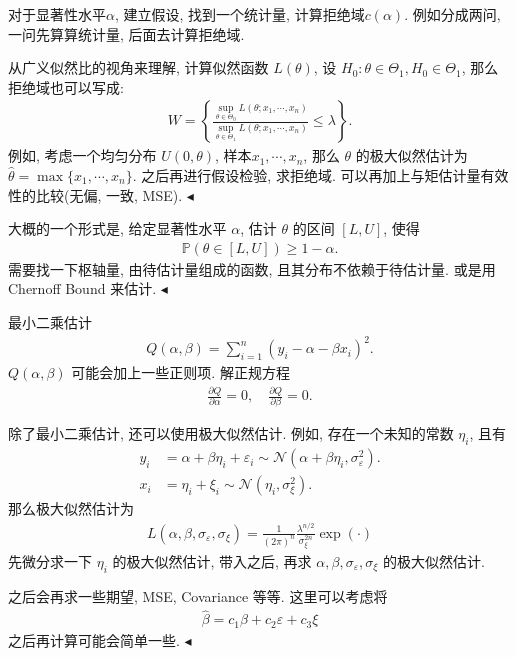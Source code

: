 \documentclass[11pt]{article}
\newenvironment{problem}[2][Problem]{\begin{trivlist}
    \item[\hskip \labelsep {\bfseries #1}\hskip \labelsep {\bfseries #2.}]\songti}{\hfill$\blacktriangleleft$\end{trivlist}}
\newcommand\1{\mathds{1}}
\newcommand\NN{\mathcal{N}}
\newcommand\PP{\mathbb{P}}
\begin{document}
\begin{problem}{5. 假设检验}
    对于显著性水平$\alpha$, 建立假设, 找到一个统计量, 计算拒绝域$c(\alpha)$. 例如分成两问, 一问先算算统计量, 后面去计算拒绝域. 

    从广义似然比的视角来理解, 计算似然函数 $L(\theta)$, 设 $H_0: \theta \in \Theta_1, H_0 \in \Theta_1$, 那么拒绝域也可以写成:
    \begin{align*}
        W = \left\{\frac{\sup_{\theta\in\Theta_0} L(\theta; x_1, \cdots, x_n)}{\sup_{\theta\in\Theta_1} L(\theta; x_1, \cdots, x_n)} \le \lambda\right\}.
    \end{align*}
    例如, 考虑一个均匀分布 $U(0, \theta)$, 样本$x_1, \cdots, x_n$, 那么 $\theta$ 的极大似然估计为 $\hat{\theta} = \max\{x_1, \cdots, x_n\}$. 之后再进行假设检验, 求拒绝域. 可以再加上与矩估计量有效性的比较(无偏, 一致, MSE).
\end{problem}

\begin{problem}{6. 区间估计}
    大概的一个形式是, 给定显著性水平 $\alpha$, 估计 $\theta$ 的区间 $[L, U]$, 使得
    \begin{align*}
        \PP(\theta \in [L, U]) \ge 1 - \alpha.
    \end{align*}
    需要找一下枢轴量, 由待估计量组成的函数, 且其分布不依赖于待估计量. 或是用 Chernoff Bound 来估计.
\end{problem}

\begin{problem}{7. 回归分析}
    最小二乘估计
    \begin{align*}
        Q(\alpha, \beta) = \sum_{i=1}^n (y_i - \alpha - \beta x_i)^2.
    \end{align*}
    $Q(\alpha, \beta)$ 可能会加上一些正则项. 解正规方程 
    \begin{align*}
        \frac{\partial Q}{\partial \alpha} = 0, \quad \frac{\partial Q}{\partial \beta} = 0.
    \end{align*}

    除了最小二乘估计, 还可以使用极大似然估计. 例如, 存在一个未知的常数 $\eta_i$, 且有
    \begin{align*}
        y_i &= \alpha + \beta \eta_i + \varepsilon_i \sim \NN(\alpha + \beta \eta_i, \sigma_{\varepsilon}^2). \\
        x_i &= \eta_i + \xi_i \sim \NN(\eta_i, \sigma_{\xi}^2).
    \end{align*}
    那么极大似然估计为
    \begin{align*}
        L(\alpha, \beta, \sigma_\varepsilon, \sigma_\xi) = \frac{1}{(2\pi)^n}\frac{\lambda^{n/2}}{\sigma_\xi^{2n}} \exp(\cdot)
    \end{align*}
    先微分求一下 $\eta_i$ 的极大似然估计, 带入之后, 再求 $\alpha, \beta, \sigma_\varepsilon, \sigma_\xi$ 的极大似然估计.

    之后会再求一些期望, MSE, Covariance 等等. 这里可以考虑将
    \begin{align*}
        \hat{\beta} = c_1 \beta + c_2 \varepsilon + c_3 \xi 
    \end{align*}
    之后再计算可能会简单一些.
\end{problem}
\end{document}
